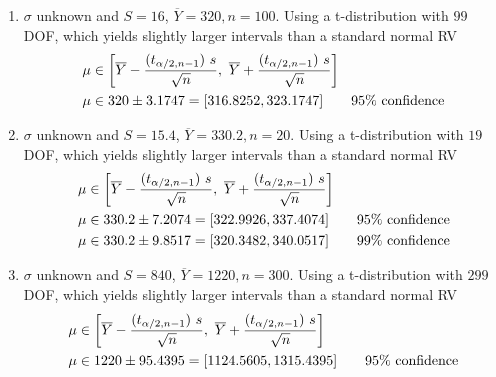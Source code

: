 \begin{enumerate}
	\item $ \sigma $ unknown and $ S = 16 $, $ \overline{Y} = 320, n = 100$. Using a t-distribution with $ 99 $ DOF, which yields slightly larger intervals than a standard normal RV\\
	\begin{subequations}
		\begin{align}
			\mu &\in \left[ \overline{Y} - \frac{(t_{\alpha/2, n-1})\ s}{\sqrt{n}}, \ \overline{Y} + \frac{(t_{\alpha/2, n-1})\ s}{\sqrt{n}} \right] \nonumber \\
			\mu &\in 320 \pm 3.1747 = [316.8252, 323.1747] \qquad \text{95\% confidence}
		\end{align}\\
	\end{subequations}
	
	\item $ \sigma $ unknown and $ S = 15.4 $, $ \overline{Y} = 330.2, n = 20$. Using a t-distribution with $ 19 $ DOF, which yields slightly larger intervals than a standard normal RV\\
	\begin{subequations}
		\begin{align}
			\mu &\in \left[ \overline{Y} - \frac{(t_{\alpha/2, n-1})\ s}{\sqrt{n}}, \ \overline{Y} + \frac{(t_{\alpha/2, n-1})\ s}{\sqrt{n}} \right] \nonumber \\
			\mu &\in 330.2 \pm 7.2074 = [322.9926, 337.4074] \qquad \text{95\% confidence} \nonumber \\
			\mu &\in 330.2 \pm 9.8517 = [320.3482, 340.0517] \qquad \text{99\% confidence}
		\end{align}\\
	\end{subequations}

	\item $ \sigma $ unknown and $ S = 840 $, $ \overline{Y} = 1220, n = 300$. Using a t-distribution with $ 299 $ DOF, which yields slightly larger intervals than a standard normal RV\\
	\begin{subequations}
		\begin{align}
			\mu &\in \left[ \overline{Y} - \frac{(t_{\alpha/2, n-1})\ s}{\sqrt{n}}, \ \overline{Y} + \frac{(t_{\alpha/2, n-1})\ s}{\sqrt{n}} \right] \nonumber \\
			\mu &\in 1220 \pm 95.4395 = [1124.5605, 1315.4395] \qquad \text{95\% confidence} 
		\end{align}\\
	\end{subequations}


\end{enumerate}
